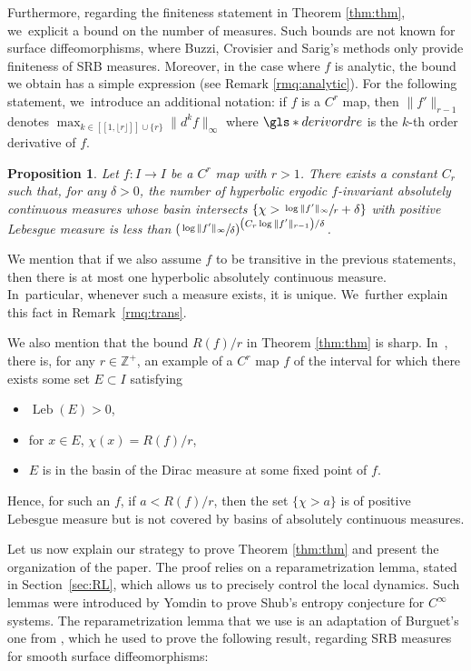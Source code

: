 \documentclass[10pt]{amsart}
\DeclareMathOperator{\Leb}{Leb}
\let\rC C
\newtheorem{proptitle}[thmtitle]{Proposition}
\theoremstyle{definition}
\newcommand{\bbZ}{{\mathbb{Z}}}
\begin{document}
Furthermore, regarding the finiteness statement in Theorem \ref{thm:thm}, we~explicit a bound on the number of measures.
Such bounds are not known for surface diffeomorphisms, where Buzzi, Crovisier and Sarig's methods \cite{BCS_mme} only provide finiteness of SRB measures. Moreover, in the case where $f$ is analytic, the bound we obtain has a simple expression (see Remark \ref{rmq:analytic}).
For the following statement, we~introduce an additional notation: if $f$ is a $\rC^r$ map, then $\| f' \|_{r-1}$ denotes $\max_{k \in [\![ 1, \lfloor r \rfloor ]\!] \cup \{ r \}} \| d^k f \|_{\infty}$ where $\gls*{derivordre}$ is the $k$-th order derivative of $f$.

\begin{proptitle}
\label{prop:title}
Let $f : I \to I$ be a $\rC^r$ map with $r > 1$.
There exists a constant $C_r$ such that, for any $\delta > 0$, the number of hyperbolic ergodic $f$\nobreakdash-invariant absolutely continuous measures whose basin intersects $\left \{ \chi > \sfrac{\log \| f' \|_{\infty}}{r} + \delta \right \}$
with positive Lebesgue measure is less than
$
\left (\sfrac{\log \| f' \|_{\infty}}{\delta} \right)^{\left (C_r \log \| f' \|_{r-1} \right) / \delta}
$.
\end{proptitle}

We mention that if we also assume $f$ to be transitive in the previous statements, then there is at most one hyperbolic absolutely continuous measure. In~particular, whenever such a measure exists, it is unique. We~further explain this fact in Remark~\ref{rmq:trans}.

We also mention that the bound $R(f) /r$ in Theorem \ref{thm:thm} is sharp. In~\cite[App.\,A]{BurguetCMP}, there is, for any $r \in \bbZ^+$, an example of a $\rC^r$ map $f$ of the interval for which there exists some set $E \subset I$ satisfying
\begin{itemize}
\item
$\Leb(E) > 0$,
\item
for $x \in E$, $\chi(x) = R(f) / r$,
\item
$E$ is in the basin of the Dirac measure at some fixed point of $f$.
\end{itemize}
Hence, for such an $f$, if $a < R(f) / r$, then the set $\{ \chi > a \}$ is of positive Lebesgue measure but is not covered by basins of absolutely continuous measures.

Let us now explain our strategy to prove Theorem \ref{thm:thm} and present the organization of the paper.
The proof relies on a reparametrization lemma, stated in Section~\ref{sec:RL}, which allows us to precisely control the local dynamics.
Such lemmas were introduced by Yomdin \cite{Yomdin1987VolumeGA} to prove Shub's entropy conjecture for $\rC^{\infty}$ systems.
The reparametrization lemma that we use is an adaptation of Burguet's one from \cite{MR4701884}, which he used to prove the following result, regarding SRB measures for smooth surface diffeomorphisms:
\end{document}
